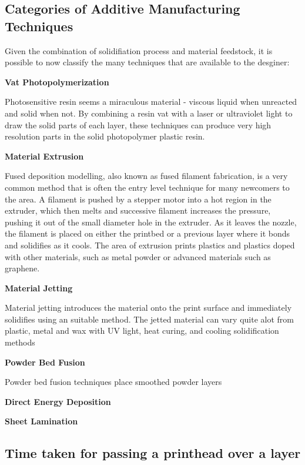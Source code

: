 \subsection{Categories of Additive Manufacturing Techniques}

Given the combination of solidifiation process and material feedstock, it is possible to now classify the many techniques that are available to the desginer: 

\textbf{Vat Photopolymerization}

Photosensitive resin seems a miraculous material - viscous liquid when unreacted and solid when not. By combining a resin vat with a laser or ultraviolet light to draw the solid parts of each layer, these techniques can produce very high resolution parts in the solid photopolymer plastic resin. 

\textbf{Material Extrusion}

Fused deposition modelling, also known as fused filament fabrication, is a very common method that is often the entry level technique for many newcomers to the area. A filament is pushed by a stepper motor into a hot region in the extruder, which then melts and successive filament increases the pressure, pushing it out of the small diameter hole in the extruder. As it leaves the nozzle, the filament is placed on either the printbed or a previous layer where it bonds and solidifies as it cools. The area of extrusion prints plastics and plastics doped with other materials, such as metal powder or advanced materials such as graphene. 

\textbf{Material Jetting}

Material jetting introduces the material onto the print surface and immediately solidifies using an suitable method. The jetted material can vary quite alot from plastic, metal and wax with UV light, heat curing, and cooling solidification methods 

\textbf{Powder Bed Fusion}

Powder bed fusion techniques place smoothed powder layers 

\textbf{Direct Energy Deposition}

\textbf{Sheet Lamination}





\subsection{Time taken for passing a printhead over a layer} 

